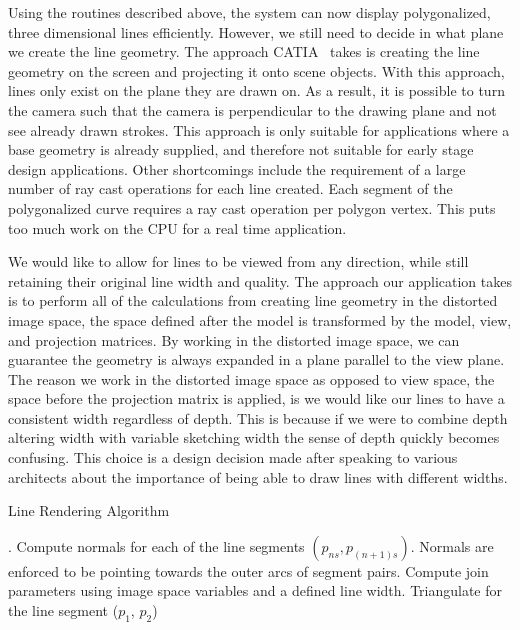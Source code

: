 Using the routines described above, the system can now display polygonalized, three dimensional lines efficiently.
However, we still need to decide in what plane we create the line geometry.
The approach CATIA~\autocite{catia} takes is creating the line geometry on the screen and projecting it onto scene objects. 
With this approach, lines only exist on the plane they are drawn on. 
As a result, it is possible to turn the camera such that the camera is perpendicular to the drawing plane and not see already drawn strokes.
This approach is only suitable for applications where a base geometry is already supplied, and therefore not suitable for early stage design applications. 
Other shortcomings include the requirement of a large number of ray cast operations for each line created.
Each segment of the polygonalized curve requires a ray cast operation per polygon vertex. 
This puts too much work on the CPU for a real time application.

We would like to allow for lines to be viewed from any direction, while still retaining their original line width and quality.
The approach our application takes is to perform all of the calculations from creating line geometry in the distorted image space, the space defined after the model is transformed by the model, view, and projection matrices.
By working in the distorted image space, we can guarantee the geometry is always expanded in a plane parallel to the view plane.
The reason we work in the distorted image space as opposed to view space, the space before the projection matrix is applied, is we would like our lines to have a consistent width regardless of depth.
This is because if we were to combine depth altering width with variable sketching width the sense of depth quickly becomes confusing.
This choice is a design decision made after speaking to various architects about the importance of being able to draw lines with different widths.

\begin{algorithm}
\caption{Line Rendering Algorithm}
\begin{algorithmic}
.
\State Compute normals for each of the line segments $(p_{ns},p_{(n+1)s})$. Normals are 
\State enforced to be pointing towards the outer arcs of segment pairs.
\State Compute join parameters using image space variables and a defined line 
\State width.
\State Triangulate for the line segment ($p_1$, $p_2$)
\EndFor
\end{algorithmic}
\end{algorithm}

